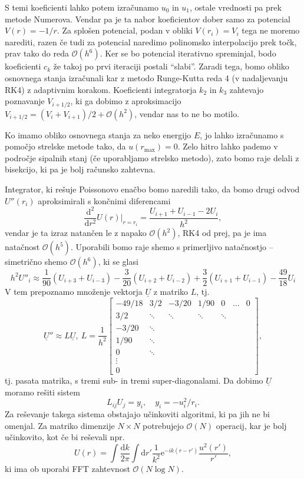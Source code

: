 \documentclass[12pt, a4 paper]{article}
\renewcommand{\d}{
	\ensuremath{\mathrm{d}}
}
\newcommand{\e}{
	\ensuremath{\mathrm{e}}
}
\begin{document}
S temi koeficienti lahko potem izra\v cunamo $u_0$ in $u_1$, ostale vrednosti pa prek metode Numerova. Vendar pa
je ta nabor koeficientov dober samo za potencial $V(r) = -1/r$. Za splo\v sen potencial, podan v obliki
$V(r_i) = V_i$ tega ne moremo narediti, razen \v ce tudi za potencial naredimo polinomsko interpolacijo prek
to\v ck, prav tako do reda $\mathcal{O}(h^6)$. Ker se bo potencial iterativno spreminjal, bodo koeficienti
$c_k$ \v ze takoj po prvi iteraciji postali "`slabi"'. Zaradi tega, bomo obliko osnovnega stanja izra\v cunali
kar z metodo Runge-Kutta reda 4 (v nadaljevanju RK4) z adaptivnim korakom. Koeficienti integratorja
$k_2$ in $k_3$ zahtevajo poznavanje $V_{i+1/2}$, ki ga dobimo z aproksimacijo $V_{i+1/2} =
(V_i + V_{i+1})/2 + \mathcal{O}(h^2)$, vendar nas to ne bo motilo.

Ko imamo obliko osnovnega stanja za neko energijo $E$, jo lahko izra\v cunamo s pomo\v cjo strelske metode
tako, da $u(r_\text{max}) = 0$. Zelo hitro lahko pademo v podro\v cje sipalnih stanj (\v ce uporabljamo strelsko
metodo), zato bomo raje delali z bisekcijo, ki pa je bolj ra\v cunsko zahtevna.

Integrator, ki re\v suje Poissonovo ena\v cbo bomo naredili tako, da bomo drugi odvod $U''(r_i)$
aproksimirali s kon\v cnimi diferencami
\[
	\frac{\d^2}{\d r^2} U(r)\Big|_{r = r_i} = \frac{U_{i+1} + U_{i-1} - 2U_i}{h^2},
\]
vendar je ta izraz natan\v cen le z napako $\mathcal{O}(h^2)$, RK4 od prej, pa je ima nata\v cnost
$\mathcal{O}(h^5)$. Uporabili bomo raje shemo s primerljivo nata\v cnostjo -- simetri\v cno shemo $\mathcal{O}
(h^6)$, ki se glasi
\begin{equation}
	h^2 U''_i \approx \frac{1}{90}(U_{i+3} + U_{i-3}) - \frac{3}{20} (U_{i+2} + U_{i-2}) + \frac{3}{2}(U_{i+1}
		+ U_{i-1}) - \frac{49}{18}U_i
\end{equation}
V tem prepoznamo mno\v zenje vektorja $\underline{U}$ z matriko $L$, tj.
\begin{equation}
	\underline{U}'' \approx L\underline{U},\ L = \frac{1}{h^2}\begin{bmatrix}
		-49/18 & 3/2 & -3/20 & 1/90 & 0 & \ldots & 0 \\
		3/2 & \ddots & \ddots & \ddots & \ddots & \\
		-3/20 & \ddots & & & & \\
		1/90 & \ddots & & & & \\
		0 & \ddots & & & & \\
		\vdots & & & & & \\
		0 & & & & &
		\end{bmatrix},
\end{equation}
tj. pasata matrika, s tremi sub- in tremi super-diagonalami. Da dobimo $\underline{U}$ moramo re\v siti
sistem
\begin{equation}
	L_{ij} U_j = y_i,\quad y_i = -u_i^2/r_i.
\end{equation}
Za re\v sevanje takega sistema obstajajo u\v cinkoviti algoritmi, ki pa jih ne bi omenjal. Za matriko dimenzije
$N\times N$ potrebujejo $\mathcal{O}(N)$ operacij, kar je bolj u\v cinkovito, kot \v ce bi re\v sevali npr.
\[
	U(r) = \int \frac{\d k}{2\pi} \int \d r' \frac{1}{k^2} \e^{-ik(r - r')} \frac{u^2(r')}{r'},
\]
ki ima ob uporabi FFT zahtevnost $\mathcal{O}(N\log N)$.
\end{document}
